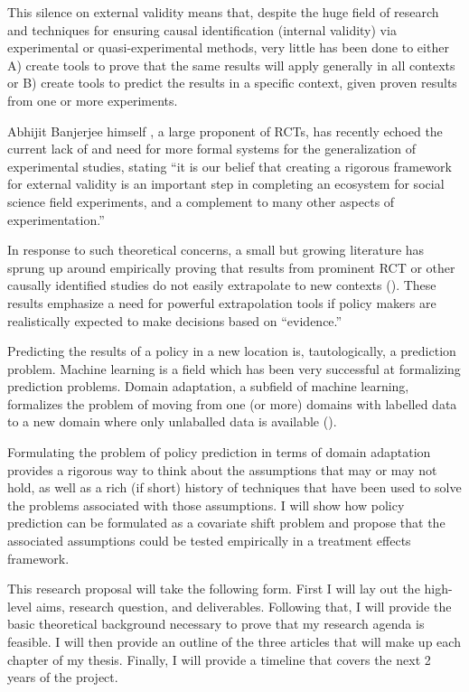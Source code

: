 \documentclass[a4paper,12pt]{article}
\begin{document}
This silence on external validity means that, despite the huge field of research and techniques for ensuring causal identification (internal validity) via experimental or quasi-experimental methods, very little has been done to either A) create tools to prove that the same results will apply generally in all contexts or B) create tools to predict the results in a specific context, given proven results from one or more experiments.

Abhijit Banjerjee himself \parencite*{Snowberg2016}, a large proponent of RCTs, has recently echoed the current lack of and need for more formal systems for the generalization of experimental studies, stating ``it is our belief that creating a rigorous framework for external validity is an important step in completing an ecosystem for social science field experiments, and a complement to many other aspects of experimentation.''

In response to such theoretical concerns, a small but growing literature  has sprung up around empirically proving that results from prominent RCT or other causally identified studies do not easily extrapolate to new contexts (\cite{Pritchett2016, Allcott2015, Bisbee2017, Rosenzweig2019}). These results emphasize a need for powerful extrapolation tools if policy makers are realistically expected to make decisions based on ``evidence.''

Predicting the results of a policy in a new location is, tautologically, a prediction problem. Machine learning is a field which has been very successful at formalizing prediction problems. Domain adaptation, a subfield of machine learning, formalizes the problem of moving from one (or more) domains with labelled data to a new domain where only unlaballed data is available (\cite[for a survey, see][]{Pan2010}).

Formulating the problem of policy prediction in terms of domain adaptation provides a rigorous way to think about the assumptions that may or may not hold, as well as a rich (if short) history of techniques that have been used to solve the problems associated with those assumptions. I will show how policy prediction can be formulated as a covariate shift problem and propose that the associated assumptions could be tested empirically in a treatment effects framework.

This research proposal will take the following form. First I will lay out the high-level aims, research question, and deliverables. Following that, I will provide the basic theoretical background necessary to prove that my research agenda is feasible. I will then provide an outline of the three articles that will make up each chapter of my thesis. Finally, I will provide a timeline that covers the next 2 years of the project.
\end{document}
